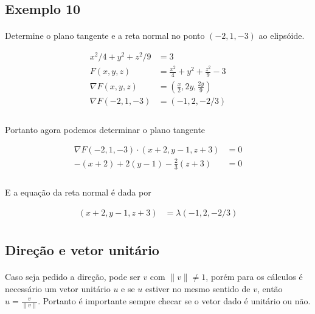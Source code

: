 \documentclass{article}
\newcommand{\norm}[1] {\left.\parallel #1 \right.\parallel}
\begin{document}
        \subsection{Exemplo 10}
            \paragraph{}
            Determine o plano tangente e a reta normal no ponto $(-2, 1, -3)$ ao elipsóide.

            \begin{align*}
                x^2 / 4 + y^2 + z^2 / 9 &= 3\\
                F(x, y, z) &= \frac{x^2}{4} + y^2 + \frac{z^2}{9} - 3\\
                \nabla F(x, y, z) &= \left( \frac{x}{2}, 2y, \frac{2y}{9} \right)\\
                \nabla F(-2, 1, -3) &= (-1, 2, -2/3)\\
            \end{align*}

            \paragraph{}
            Portanto agora podemos determinar o plano tangente

            \begin{align*}
                \nabla F(-2, 1, -3) \cdot (x + 2, y - 1, z + 3) &= 0\\
                -(x + 2) + 2(y-1) - \frac{2}{3}(z + 3) &= 0\\
            \end{align*}

            \paragraph{}
            E a equação da reta normal é dada por
            
            \begin{align*}
                (x + 2, y - 1, z + 3) &= \lambda (-1, 2, -2/3)\\
            \end{align*}

    \begin{appendix}
        \section{Direção e vetor unitário}
            \paragraph{}
            Caso seja pedido a direção, pode ser $v$ com $\norm{v} \neq 1$, porém para os cálculos é necessário um vetor unitário $u$ e se
            $u$ estiver no mesmo sentido de $v$, então $u = \frac{v}{\norm{v}}$. Portanto é importante sempre checar se o vetor dado é unitário
            ou não.
    \end{appendix}
\end{document}
